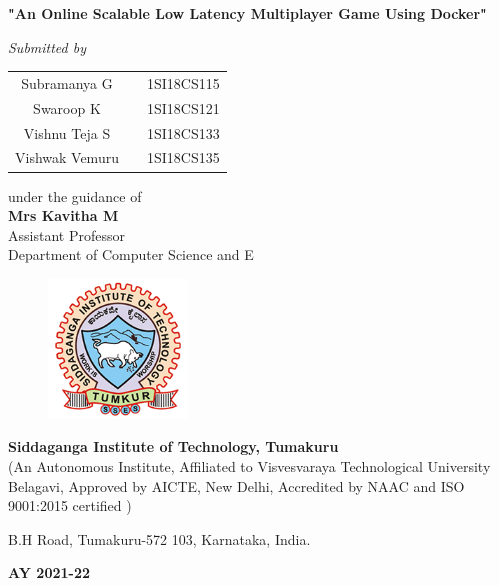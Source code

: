 \begin{titlingpage}
\begin{LARGE}
	\textbf{"An Online Scalable Low Latency Multiplayer Game Using Docker"}
\end{LARGE}

\begin{small}
	\emph{Submitted by}
\end{small}

\vfill
\begin{tabular}{ccc}
\Large{Subramanya G}&  &\Large{1SI18CS115}\\
\Large{Swaroop K}&  &\Large{1SI18CS121}\\
\Large{Vishnu Teja S}&  &\Large{1SI18CS133}\\
\Large{Vishwak Vemuru}&  &\Large{1SI18CS135}\\
\end{tabular}
\vfill

{\normalsize under the guidance of}\\
\Large{\textbf{Mrs Kavitha M}}\\
Assistant Professor\\
Department of Computer Science and E\ngineering\\
\vfill
\begin{figure}[h]
    \centering
    \includegraphics[height=3.7cm]{images/sit.png}
\end{figure}

\LARGE{\textbf{Siddaganga Institute of Technology, Tumakuru}\\}
{\normalsize (An Autonomous Institute, Affiliated to Visvesvaraya Technological University Belagavi, 
	Approved by AICTE, New Delhi, Accredited by NAAC and ISO 9001:2015 certified
	)} \\

\begin{normalsize}
B.H Road, Tumakuru-572 103, Karnataka, India.\\
\end{normalsize}

\Large{\textbf{AY 2021-22}}
\end{titlingpage}
